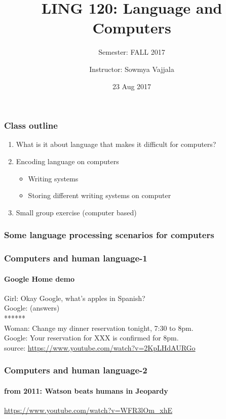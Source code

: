 \documentclass{beamer}
\author[Sowmya Vajjala]{Instructor: Sowmya Vajjala}
\title[LING 120]{LING 120: Language and Computers}
\subtitle{Semester: FALL 2017}
\date{23 Aug 2017}
\institute{Iowa State University, USA}
\begin{document}
\begin{frame}\titlepage
\end{frame}

\begin{frame}
\frametitle{Class outline}
\begin{enumerate}
\item What is it about language that makes it difficult for computers? %
\item Encoding language on computers
\begin{itemize}
\item Writing systems %
\item Storing different writing systems on computer %
\end{itemize}
\item Small group exercise (computer based)
\end{enumerate}
\end{frame}

\begin{frame}
\frametitle{Some language processing scenarios for computers}
\end{frame}

\begin{frame}
\frametitle{Computers and human language-1}
\framesubtitle{Google Home demo}
Girl: Okay Google, what's apples in Spanish?
\\ Google: (answers)
\\ ****** 
\\ Woman: Change my dinner reservation tonight, 7:30 to 8pm.
\\ Google: Your reservation for XXX is confirmed for 8pm. 
\\ source: \url{https://www.youtube.com/watch?v=2KpLHdAURGo}
\end{frame}


\begin{frame}
\frametitle{Computers and human language-2}
\framesubtitle{from 2011: Watson beats humans in Jeopardy}
\url{https://www.youtube.com/watch?v=WFR3lOm_xhE}
\end{frame}
\end{document}
